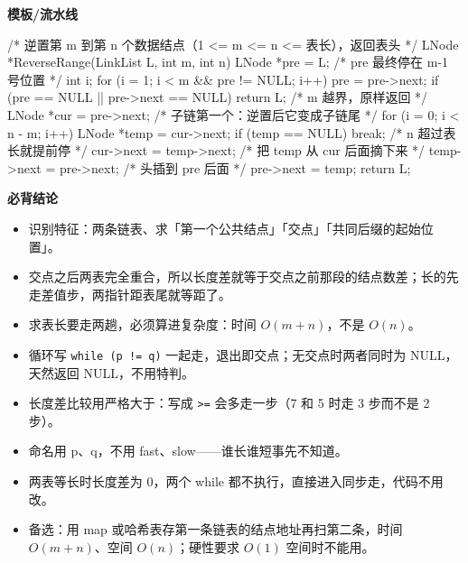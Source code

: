 \documentclass[10pt,a4paper]{ctexart}
\begin{document}
\textbf{模板/流水线}

\begin{codebox}
/* 逆置第 m 到第 n 个数据结点（1 <= m <= n <= 表长），返回表头 */
LNode *ReverseRange(LinkList L, int m, int n) {
    LNode *pre = L;                        /* pre 最终停在 m-1 号位置 */
    int i;
    for (i = 1; i < m && pre != NULL; i++) pre = pre->next;
    if (pre == NULL || pre->next == NULL) return L;   /* m 越界，原样返回 */
    LNode *cur = pre->next;                /* 子链第一个：逆置后它变成子链尾 */
    for (i = 0; i < n - m; i++) {
        LNode *temp = cur->next;
        if (temp == NULL) break;           /* n 超过表长就提前停 */
        cur->next = temp->next;            /* 把 temp 从 cur 后面摘下来 */
        temp->next = pre->next;            /* 头插到 pre 后面 */
        pre->next = temp;
    }
    return L;
}
\end{codebox}





\textbf{必背结论}

\begin{itemize}

\item 识别特征：两条链表、求「第一个公共结点」「交点」「共同后缀的起始位置」。

\item 交点之后两表完全重合，所以长度差就等于交点之前那段的结点数差；长的先走差值步，两指针距表尾就等距了。

\item 求表长要走两趟，必须算进复杂度：时间 $O(m+n)$，不是 $O(n)$。

\item 循环写 \texttt{while (p != q)} 一起走，退出即交点；无交点时两者同时为 NULL，天然返回 NULL，不用特判。

\item 长度差比较用严格大于：写成 \texttt{>=} 会多走一步（7 和 5 时走 3 步而不是 2 步）。

\item 命名用 p、q，不用 fast、slow——谁长谁短事先不知道。

\item 两表等长时长度差为 0，两个 while 都不执行，直接进入同步走，代码不用改。

\item 备选：用 map 或哈希表存第一条链表的结点地址再扫第二条，时间 $O(m+n)$、空间 $O(n)$；硬性要求 $O(1)$ 空间时不能用。

\end{itemize}
\end{document}

